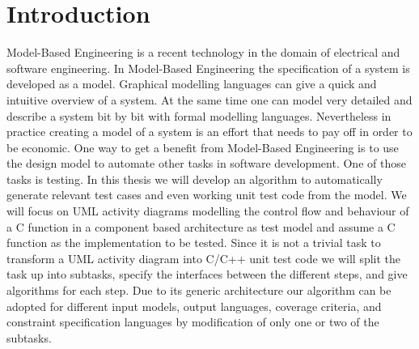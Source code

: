 \chapter{Introduction}
Model-Based Engineering is a recent technology in the domain of electrical and software engineering. In Model-Based Engineering the specification of a system is developed as a model.
Graphical modelling languages can give a quick and intuitive overview of a system. At the same time one can model very detailed and describe a system bit by bit with formal modelling languages.
Nevertheless in practice creating a model of a system is an effort that needs to pay off in order to be economic.
One way to get a benefit from Model-Based Engineering is to use the design model to automate other tasks in software development. One of those tasks is testing. 
In this thesis we will develop an algorithm to automatically generate relevant test cases and even working unit test code from the model. We will focus on UML activity diagrams modelling the control flow and behaviour of a C function in a component based architecture as test model and assume a C function as the implementation to be tested. Since it is not a trivial task to transform a UML activity diagram into C/C++ unit test code we will split the task up into subtasks, specify the interfaces between the different steps, and give algorithms for each step. Due to its generic architecture our algorithm can be adopted for different input models, output languages, coverage criteria, and constraint specification languages by modification of only one or two of the subtasks.
